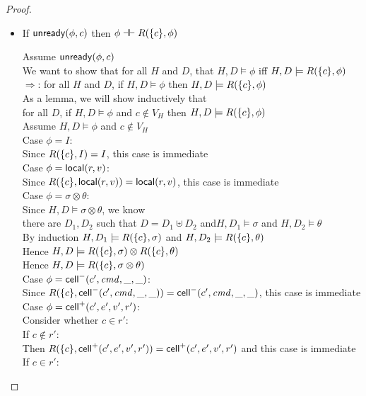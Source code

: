 \begin{proof}
\begin{itemize}
\item If $\mathsf{unready}({\phi}, {c})$ then $\phi \dashv\vdash R(\{{c}\}, \phi)$
\begin{tabbedproof}
\oo Assume $\mathsf{unready}({\phi}, {c})$ \\
\oo We want to show that for all $H$ and $D$, that $H, D \models \phi$ iff $H, D \models R(\{{c}\}, \phi)$ \\
\oo $\Rightarrow$: for all $H$ and $D$, if $H, D \models \phi$ then $H, D \models R(\{{c}\}, \phi)$ \\
\ooo As a lemma, we will show inductively that \\
\ooox for all $D$, if $H, D \models \phi$ and $c \not\in V_H$ then $H, D \models R(\{{c}\}, \phi)$ \\ 
\ooo Assume $H, D \models \phi$ and $c \not\in V_H$ \\ 
\ooo Case $\phi = I$: \\
\oooo Since $R(\{{c}\}, I) = I$, this case is immediate \\
\ooo Case $\phi = \mathsf{local}({r}, {v})$: \\
\oooo Since $R(\{{c}\}, \mathsf{local}({r}, {v})) = \mathsf{local}({r}, {v})$, this case is immediate \\
\ooo Case $\phi = \sigma \otimes \theta$: \\
\oooo Since $H, D \models \sigma \otimes \theta$, we know  \\
\ooox there are $D_1, D_2$ such that $D = D_1 \uplus D_2$ and$H, D_1 \models \sigma$ and $H, D_2 \models \theta$ \\
\oooo By induction $H, D_1 \models R(\{{c}\}, \sigma)$ and $H, D_2 \models R(\{{c}\}, \theta)$ \\
\oooo Hence $H, D \models R(\{{c}\}, \sigma) \otimes R(\{{c}\}, \theta)$ \\
\oooo Hence $H, D \models R(\{{c}\}, \sigma \otimes \theta)$ \\
\ooo Case $\phi = \mathsf{cell}^{-}({c'}, {\mathit{cmd}}, {\_}, {\_})$: \\
\oooo Since $R(\{{c}\}, \mathsf{cell}^{-}({c'}, {\mathit{cmd}}, {\_}, {\_})) = \mathsf{cell}^{-}({c'}, {\mathit{cmd}}, {\_}, {\_})$, this case is immediate \\
\ooo Case $\phi = \mathsf{cell}^{+}({c'}, {e'}, {v'}, {r'})$: \\
\oooo Consider whether $c \in r'$: \\
\oooo If $c \not\in r'$: \\
\ooooo Then $R(\{{c}\}, \mathsf{cell}^{+}({c'}, {e'}, {v'}, {r'})) = \mathsf{cell}^{+}({c'}, {e'}, {v'}, {r'})$ and this case is immediate \\
\oooo If $c \in r'$: \\

\end{tabbedproof}
\end{itemize}
\end{proof}
